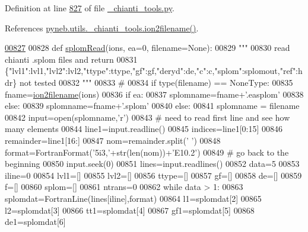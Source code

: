 Definition at line \hyperlink{__chianti__tools_8py_source_l00827}{827} of file \hyperlink{__chianti__tools_8py_source}{\-\_\-chianti\-\_\-tools.\-py}.



References \hyperlink{__chianti__tools_8py_source_l00396}{pyneb.\-utils.\-\_\-chianti\-\_\-tools.\-ion2filename()}.


\begin{DoxyCode}
\hypertarget{namespacepyneb_1_1utils_1_1__chianti__tools_l00827}{}\hyperlink{namespacepyneb_1_1utils_1_1__chianti__tools_a8013cd9bdbf2f8ec5a5ac06e25b0e3a4}{00827} 
00828 \textcolor{keyword}{def }\hyperlink{namespacepyneb_1_1utils_1_1__chianti__tools_a8013cd9bdbf2f8ec5a5ac06e25b0e3a4}{splomRead}(ions, ea=0, filename=None):
00829     \textcolor{stringliteral}{"""}
00830 \textcolor{stringliteral}{    read chianti .splom files and return}
00831 \textcolor{stringliteral}{    \{"lvl1":lvl1,"lvl2":lvl2,"ttype":ttype,"gf":gf,"deryd":de,"c":c,"splom":splomout,"ref":hdr\} not tested}
00832 \textcolor{stringliteral}{    """}
00833     \textcolor{comment}{#}
00834     \textcolor{keywordflow}{if} type(filename) == NoneType:
00835         fname=\hyperlink{namespacepyneb_1_1utils_1_1__chianti__tools_a7748521ca99103785680d691667ce851}{ion2filename}(ions)
00836         \textcolor{keywordflow}{if} ea:
00837             splomname=fname+\textcolor{stringliteral}{'.easplom'}
00838         \textcolor{keywordflow}{else}:
00839             splomname=fname+\textcolor{stringliteral}{'.splom'}
00840     \textcolor{keywordflow}{else}:
00841         splomname = filename
00842     input=open(splomname,\textcolor{stringliteral}{'}\textcolor{stringliteral}{r')}
00843 \textcolor{stringliteral}{    }\textcolor{comment}{#  need to read first line and see how many elements}
00844     line1=input.readline()
00845     indices=line1[0:15]
00846     remainder=line1[16:]
00847     nom=remainder.split(\textcolor{stringliteral}{' '})
00848     format=FortranFormat(\textcolor{stringliteral}{'5i3,'}+str(len(nom))+\textcolor{stringliteral}{'E10.2'})
00849     \textcolor{comment}{#  go back to the beginning}
00850     input.seek(0)
00851     lines=input.readlines()
00852     data=5
00853     iline=0
00854     lvl1=[]
00855     lvl2=[]
00856     ttype=[]
00857     gf=[]
00858     de=[]
00859     f=[]
00860     splom=[]
00861     ntrans=0
00862     \textcolor{keywordflow}{while} data > 1:
00863         splomdat=FortranLine(lines[iline],format)
00864         l1=splomdat[2]
00865         l2=splomdat[3]
00866         tt1=splomdat[4]
00867         gf1=splomdat[5]
00868         de1=splomdat[6]

\end{DoxyCode}
